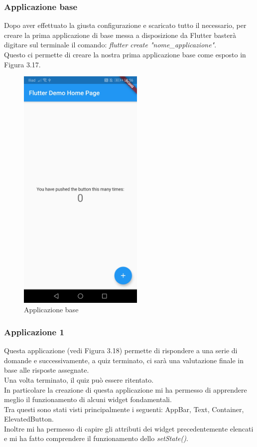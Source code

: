 \subsubsection{Applicazione base}
Dopo aver effettuato la giusta configurazione e scaricato tutto il necessario, per creare la prima applicazione di base messa a disposizione da Flutter basterà digitare sul terminale il comando: \textit{flutter create "nome\_applicazione"}.\\
Questo ci permette di creare la nostra prima applicazione base come esposto in Figura 3.17.\\

\begin{figure}[htbp]	
	\centering
	\includegraphics[width=6cm]{immagini/base.jpeg}
	\caption{Applicazione base}
	\label{fig:Applicazione base}
\end{figure}

\newpage

\subsubsection{Applicazione 1}
Questa applicazione (vedi Figura 3.18) permette di rispondere a una serie di domande e successivamente, a quiz terminato, ci sarà una valutazione finale in base alle risposte assegnate.\\
Una volta terminato, il quiz può essere ritentato.\\
In particolare la creazione di questa applicazione mi ha permesso di apprendere meglio il funzionamento di alcuni widget fondamentali.\\
Tra questi sono stati visti principalmente i seguenti: AppBar, Text, Container, ElevatedButton.\\
Inoltre mi ha permesso di capire gli attributi dei widget precedentemente elencati e mi ha fatto comprendere il funzionamento dello \textit{setState()}.\\

